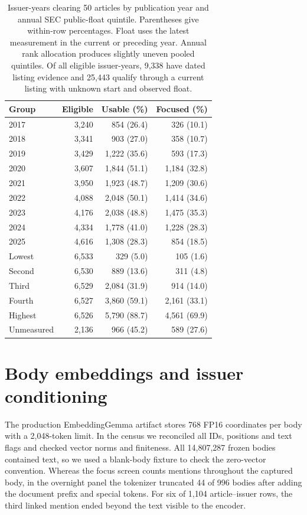 \begin{table}[t]
  \centering\small
  \caption{Issuer-years clearing 50 articles by publication year and
    annual SEC public-float quintile. Parentheses give within-row
    percentages. Float uses the latest measurement in the current or
    preceding year. Annual rank allocation produces slightly uneven
    pooled quintiles. Of all eligible issuer-years, 9,338 have dated
    listing evidence and 25,443 qualify through a current listing with
  unknown start and observed float.}
  \label{tab:size-year}
  \begin{tabular}{lrrr}\toprule
    Group & Eligible & Usable (\%) & Focused (\%) \\ \midrule
    2017 & 3,240 & 854 (26.4) & 326 (10.1) \\
    2018 & 3,341 & 903 (27.0) & 358 (10.7) \\
    2019 & 3,429 & 1,222 (35.6) & 593 (17.3) \\
    2020 & 3,607 & 1,844 (51.1) & 1,184 (32.8) \\
    2021 & 3,950 & 1,923 (48.7) & 1,209 (30.6) \\
    2022 & 4,088 & 2,048 (50.1) & 1,414 (34.6) \\
    2023 & 4,176 & 2,038 (48.8) & 1,475 (35.3) \\
    2024 & 4,334 & 1,778 (41.0) & 1,228 (28.3) \\
    2025 & 4,616 & 1,308 (28.3) & 854 (18.5) \\
    Lowest & 6,533 & 329 (5.0) & 105 (1.6) \\
    Second & 6,530 & 889 (13.6) & 311 (4.8) \\
    Third & 6,529 & 2,084 (31.9) & 914 (14.0) \\
    Fourth & 6,527 & 3,860 (59.1) & 2,161 (33.1) \\
    Highest & 6,526 & 5,790 (88.7) & 4,561 (69.9) \\
    Unmeasured & 2,136 & 966 (45.2) & 589 (27.6) \\
    \bottomrule
  \end{tabular}
\end{table}

\section{Body embeddings and issuer conditioning}

The production EmbeddingGemma artifact \citep{embeddinggemma2025} stores
768 FP16 coordinates per body with a 2,048-token limit. In the census we
reconciled all IDs, positions and text flags and checked vector norms
and finiteness. All 14,807,287 frozen bodies contained text, so we used
a blank-body fixture to check the zero-vector convention. Whereas the
focus screen counts mentions throughout the captured body, in the
overnight panel the tokenizer truncated 44 of 996 bodies after adding
the document prefix and special tokens. For six of 1,104 article--issuer
rows, the third linked mention ended beyond the text visible to the
encoder.

